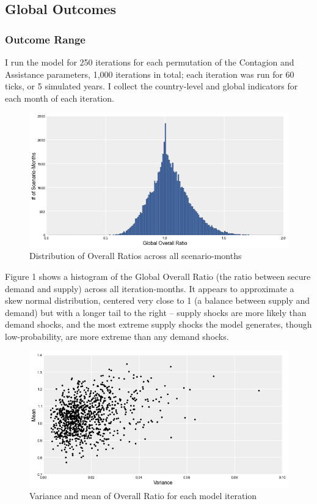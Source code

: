 \documentclass{article}
\begin{document}
\subsection{Global Outcomes}

\subsubsection{Outcome Range}

I run the model for 250 iterations for each permutation of the Contagion and Assistance parameters, 1,000 iterations in total; each iteration was run for 60 ticks, or 5 simulated years. I collect the country-level and global indicators for each month of each iteration. 

\begin{figure}[h!]
	\centering
	\includegraphics[width=\textwidth]{../Graphics/OverallDistribution}
	\caption{Distribution of Overall Ratios across all scenario-months}

\end{figure}

Figure 1 shows a histogram of the Global Overall Ratio (the ratio between secure demand and supply) across all iteration-months. It appears to approximate a skew normal distribution, centered very close to 1 (a balance between supply and demand) but with a longer tail to the right -- supply shocks are more likely than demand shocks, and the most extreme supply shocks the model generates, though low-probability, are more extreme than any demand shocks. 

\begin{figure}[h!]
	\centering
	\includegraphics[width=\textwidth]{../Graphics/OverallVarMeanScatter}
	\caption{Variance and mean of Overall Ratio for each model iteration}
\end{figure}
\end{document}
